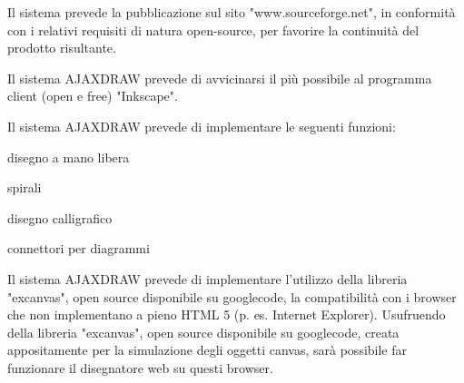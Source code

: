 \begin{elenconumerato}{\subsecindent}
\item Il sistema prevede la pubblicazione sul sito "www.sourceforge.net", in conformit\`a con i relativi requisiti di natura open-source, per favorire la continuit\`a del prodotto risultante.
\end{elenconumerato}

\begin{elenconumerato}{\subsecindent}
\item Il sistema AJAXDRAW prevede di avvicinarsi il pi\`u possibile al programma client (open e free) "Inkscape". 
\item Il sistema AJAXDRAW prevede di implementare le seguenti funzioni:

\begin{list}{-}{}
\item disegno a mano libera
\item spirali
\item disegno calligrafico
\item connettori per diagrammi
\end{list}

\item Il sistema  AJAXDRAW prevede di implementare l'utilizzo della libreria "excanvas", open source disponibile su googlecode, la compatibilit\`a con i browser che non implementano a pieno HTML 5 (p. es. Internet Explorer).
         Usufruendo della libreria "excanvas", open source disponibile su googlecode, creata appositamente per la simulazione degli oggetti canvas, sar\`a possibile far funzionare il disegnatore web su questi browser. 
\end{elenconumerato}


